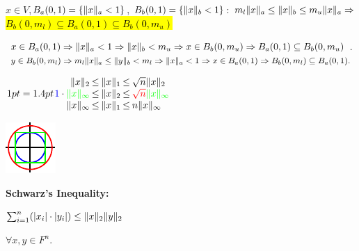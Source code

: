 \begin{Fact}
$x\in V$,$B_a(0,1)=\{\|x\|_{a}<1\}$, $B_b(0,1)=\{\|x\|_{b}<1\}$: $m_l\|x\|_{a}\le\|x\|_{b}\le m_u\|x\|_{a}\Rightarrow$\hl{$B_b(0,m_l)\subseteq B_a(0,1)\subseteq B_b(0,m_u)$}
\end{Fact}
\begin{Proof}
$x\in B_a(0,1)\Rightarrow\|x\|_{a}<1\Rightarrow\|x\|_{b}<m_u\Rightarrow x\in B_b(0,m_u)\Rightarrow B_a(0,1)\subseteq B_b(0,m_u)$.
$y\in B_b(0,m_l)\Rightarrow m_l\|x\|_{a}\le \|y\|_{b}<m_l\Rightarrow \|x\|_{a}<1\Rightarrow x\in B_a(0,1)\Rightarrow B_b(0,m_l)\subseteq B_a(0,1).$ \QED
\end{Proof}
\begin{minipage}{0.45\columnwidth}
$
\arraycolsep=1.4pt
\begin{array}{rcccl}
\fnorm{x}{2}&\le&\fnorm{x}{1}&\le&\sqrt{n}\fnorm{x}{2} \\
\textcolor{blue}{1}\cdot\textcolor{green}{\fnorm{x}{\infty}}&\le&\fnorm{x}{2}&\le&\textcolor{red}{\sqrt{n}}\textcolor{green}{\fnorm{x}{\infty}}\\
\fnorm{x}{\infty}&\le&\fnorm{x}{1}&\le& n\fnorm{x}{\infty}
\end{array}
$
\end{minipage}%
\begin{minipage}{0.07\columnwidth}
\begin{center}
\includegraphics[width=1\columnwidth]{figures/norm_bounded.pdf}
\end{center}
\end{minipage}%
\begin{minipage}{0.48\columnwidth}
\textbf{Schwarz's Inequality:}
\begin{center}
$\sum_{i=1}^n(|x_i|\cdot |y_i|)\le\|x\|_{2}\|y\|_{2}$
\end{center}
$\forall x,y\in F^n$.
\end{minipage}

